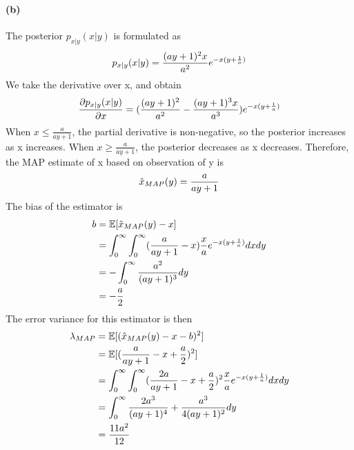 \documentclass{article}
\begin{document}
\paragraph{(b)}
The posterior $p_{x|y}(x|y)$ is formulated as
\begin{align}
	p_{x|y}(x|y)=\frac{(ay+1)^2x}{a^2}e^{-x(y+\frac{1}{a})}\notag
\end{align}
We take the derivative over x, and obtain
\begin{align}
	\frac{\partial p_{x|y}(x|y)}{\partial x}=(\frac{(ay+1)^2}{a^2}-\frac{(ay+1)^3x}{a^3})e^{-x(y+\frac{1}{a})}\notag
\end{align}
When $x\le \frac{a}{ay+1}$, the partial derivative is non-negative, so the posterior increases as x increases. When $x\ge \frac{a}{ay+1}$, the posterior decreases as x decreases. Therefore, the MAP estimate of x based on observation of y is
\begin{align}
	\hat{x}_{MAP}(y)=\frac{a}{ay+1}\notag
\end{align}
The bias of the estimator is 
\begin{align}
	b&=\mathbb{E}[\hat{x}_{MAP}(y)-x]\notag\\
	&=\int^{\infty}_{0}\int^{\infty}_{0}(\frac{a}{ay+1}-x)\frac{x}{a}e^{-x(y+\frac{1}{a})}dxdy\notag\\
	&=-\int^{\infty}_{0}\frac{a^2}{(ay+1)^3}dy\notag\\
	&=-\frac{a}{2}\notag
\end{align}
The error variance for this estimator is then
\begin{align}
	\lambda_{MAP}&=\mathbb{E}[(\hat{x}_{MAP}(y)-x-b)^2]\notag\\
	&=\mathbb{E}[(\frac{a}{ay+1}-x+\frac{a}{2})^2]\notag\\
	&=\int^{\infty}_{0}\int^{\infty}_{0}(\frac{2a}{ay+1}-x+\frac{a}{2})^2\frac{x}{a}e^{-x(y+\frac{1}{a})}dxdy\notag\\
	&=\int^{\infty}_{0}\frac{2a^3}{(ay+1)^4}+\frac{a^3}{4(ay+1)^2}dy\notag\\
	&=\frac{11a^2}{12}\notag
\end{align}
\end{document}
